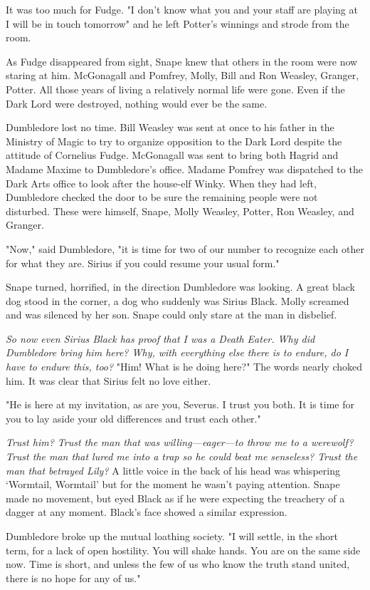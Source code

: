 It was too much for Fudge. "I don't know what you and your staff are playing at{\el} I will be in touch tomorrow{\el}" and he left Potter's winnings and strode from the room.

As Fudge disappeared from sight, Snape knew that others in the room were now staring at him. McGonagall and Pomfrey, Molly, Bill and Ron Weasley, Granger, Potter. All those years of living a relatively normal life were gone. Even if the Dark Lord were destroyed, nothing would ever be the same.

Dumbledore lost no time. Bill Weasley was sent at once to his father in the Ministry of Magic to try to organize opposition to the Dark Lord despite the attitude of Cornelius Fudge. McGonagall was sent to bring both Hagrid and Madame Maxime to Dumbledore's office. Madame Pomfrey was dispatched to the Dark Arts office to look after the house-elf Winky. When they had left, Dumbledore checked the door to be sure the remaining people were not disturbed. These were himself, Snape, Molly Weasley, Potter, Ron Weasley, and Granger.

"Now," said Dumbledore, "it is time for two of our number to recognize each other for what they are. Sirius{\el} if you could resume your usual form."

Snape turned, horrified, in the direction Dumbledore was looking. A great black dog stood in the corner, a dog who suddenly was Sirius Black. Molly screamed and was silenced by her son. Snape could only stare at the man in disbelief.

\emph{So now even Sirius Black has proof that I was a Death Eater. Why did Dumbledore bring him here? Why, with everything else there is to endure, do I have to endure this, too?} "Him! What is he doing here?" The words nearly choked him. It was clear that Sirius felt no love either.

"He is here at my invitation, as are you, Severus. I trust you both. It is time for you to lay aside your old differences and trust each other."

\emph{Trust him? Trust the man that was willing—eager—to throw me to a werewolf? Trust the man that lured me into a trap so he could beat me senseless? Trust the man that betrayed Lily?} A little voice in the back of his head was whispering `Wormtail, Wormtail' but for the moment he wasn't paying attention. Snape made no movement, but eyed Black as if he were expecting the treachery of a dagger at any moment. Black's face showed a similar expression.

Dumbledore broke up the mutual loathing society. "I will settle, in the short term, for a lack of open hostility. You will shake hands. You are on the same side now. Time is short, and unless the few of us who know the truth stand united, there is no hope for any of us."

